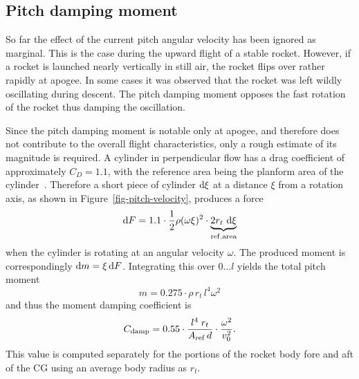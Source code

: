 



\pagebreak[4]
\subsection{Pitch damping moment}

So far the effect of the current pitch angular velocity has been
ignored as marginal.  This is the case during the upward flight of a
stable rocket.  However, if a rocket is launched nearly vertically in
still air, the rocket flips over rather rapidly at apogee.  In
some cases it was observed that the rocket was left wildly oscillating
during descent.  The pitch damping moment opposes the fast rotation of
the rocket thus damping the oscillation.

Since the pitch damping moment is notable only at apogee, and
therefore does not contribute to the overall flight characteristics,
only a rough estimate of its magnitude is required.  A cylinder in
perpendicular flow has a drag coefficient of approximately $C_D=1.1$,
with the reference area being the planform area of the
cylinder~\cite[p.~3-11]{hoerner}.  Therefore a short piece of cylinder
$\dif\xi$ at a distance $\xi$ from a rotation axis, as shown in
Figure~\ref{fig-pitch-velocity}, produces a force
%
\begin{equation}
\dif F = 1.1 \cdot \frac{1}{2}\rho(\omega\xi)^2 \cdot 
\underbrace{2r_t\,\dif\xi}_{\rm ref.area}
\end{equation}
%
when the cylinder is rotating at an angular velocity $\omega$.  The
produced moment is correspondingly $\dif m = \xi\dif F$.  Integrating
this over $0\ldots l$ yields the total pitch moment
%
\begin{equation}
m = 0.275 \cdot \rho\, r_t\, l^4 \omega^2
\end{equation}
%
and thus the moment damping coefficient is
%
\begin{equation}
C_{\rm damp} = 
    0.55 \cdot \frac{l^4\; r_t}{A_{\rm ref}\, d}\cdot\frac{\omega^2}{v_0^2}.
\end{equation}
%
This value is computed separately for the portions of the rocket body
fore and aft of the CG using an average body radius as $r_t$.

